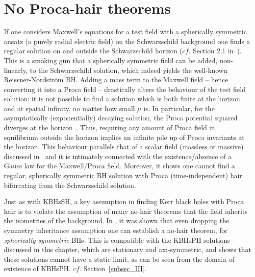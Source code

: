\section{No Proca-hair theorems}
\label{sec_nohair}
If one considers Maxwell's equations for a test field with a spherically symmetric ansatz (a purely radial electric field) on the Schwarzschild background one finds a regular solution on and outside the Schwarzschild horizon ($cf.$ Section 2.1 in~\cite{Herdeiro:2015waa}). This is a smoking gun that a spherically symmetric field can be added, non-linearly, to the Schwarzschild solution, which indeed yields the well-known Reissner-Nordstr\"om BH. 
Adding a mass term to the Maxwell field -- hence converting it into a Proca field -- drastically alters the behaviour of the test field solution: it is not possible to find a solution which is both finite at the horizon and at spatial infinity, no matter how small $\mu$ is. 
In particular, for the asymptotically (exponentially) decaying solution, the Proca potential squared diverges at the horizon~\cite{Gottlieb:1984jg}.
Thus, requiring any amount of Proca field in equilibrium outside the horizon implies an infinite pile up of Proca invariants at the horizon.
This behaviour parallels that of a scalar field (massless or massive) discussed in~\cite{Herdeiro:2015waa} and it is intimately connected with the existence/absence of a Gauss law for the Maxwell/Proca field.
Moreover, it shows one cannot find a regular, spherically symmetric BH solution with Proca (time-independent) hair bifurcating from the Schwarzschild solution.

Just as with KBHsSH, a key assumption in finding Kerr black holes with Proca hair is to violate the assumption of many no-hair theorems that the field inherits the isometries of the background.
In \cite{Herdeiro:2016tmi}, it was shown that even dropping the symmetry inheritance assumption one can establish a no-hair theorem, for \textit{spherically symmetric} BHs.
This is compatible with the KBHsPH solutions discussed in this chapter, which are stationary and axi-symmetric, and shows that these solutions cannot have a static limit,
as can be seen from the domain of existence of KBHsPH, $cf.$ Section~\ref{subsec_III}.

